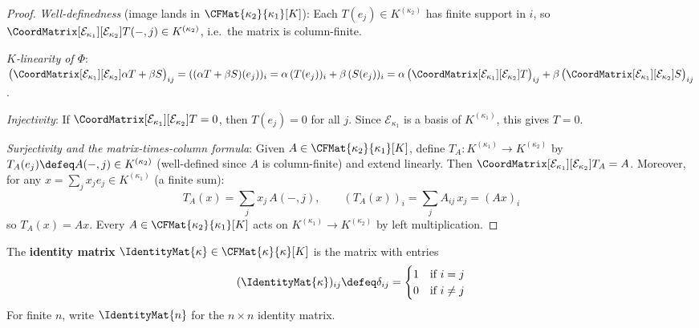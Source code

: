 \begin{proof}
    \textit{Well-definedness} (image lands in $\CFMat{\kappa_2}{\kappa_1}[K]$):
    Each $T(e_j) \in K^{(\kappa_2)}$ has finite support in $i$, so
    $\CoordMatrix[\mathcal{E}_{\kappa_1}][\mathcal{E}_{\kappa_2}]{T}(-,j)
    \in K^{(\kappa_2)}$, i.e.\ the matrix is column-finite.

    \textit{$K$-linearity of $\Phi$}:
    $\bigl(\CoordMatrix[\mathcal{E}_{\kappa_1}][\mathcal{E}_{\kappa_2}]{\alpha T + \beta S}
    \bigr)_{ij}
    = ((\alpha T + \beta S)(e_j))_i
    = \alpha\, (T(e_j))_i + \beta\, (S(e_j))_i
    = \alpha\, \bigl(\CoordMatrix[\mathcal{E}_{\kappa_1}][\mathcal{E}_{\kappa_2}]{T}
    \bigr)_{ij}
    + \beta\, \bigl(\CoordMatrix[\mathcal{E}_{\kappa_1}][\mathcal{E}_{\kappa_2}]{S}
    \bigr)_{ij}$.

    \textit{Injectivity}:
    If $\CoordMatrix[\mathcal{E}_{\kappa_1}][\mathcal{E}_{\kappa_2}]{T} = 0$, then
    $T(e_j) = 0$ for all $j$. Since $\mathcal{E}_{\kappa_1}$ is a basis of $K^{(\kappa_1)}$,
    this gives $T = 0$.

    \textit{Surjectivity and the matrix-times-column formula}:
    Given $A \in \CFMat{\kappa_2}{\kappa_1}[K]$, define $T_A: K^{(\kappa_1)} \to K^{(\kappa_2)}$
    by $T_A(e_j) \defeq A(-,j) \in K^{(\kappa_2)}$ (well-defined since $A$ is column-finite)
    and extend linearly. Then
    $\CoordMatrix[\mathcal{E}_{\kappa_1}][\mathcal{E}_{\kappa_2}]{T_A} = A$.
    Moreover, for any $x = \sum_j x_j e_j \in K^{(\kappa_1)}$ (a finite sum):
    \[
        T_A(x) = \sum_j x_j\, A(-,j), \qquad
        (T_A(x))_i = \sum_j A_{ij}\, x_j = (Ax)_i
    \]
    so $T_A(x) = Ax$. Every $A \in \CFMat{\kappa_2}{\kappa_1}[K]$ acts on
    $K^{(\kappa_1)} \to K^{(\kappa_2)}$ by left multiplication.
\end{proof}

\begin{definition}
\label{def:identity-matrix}
    The \textbf{identity matrix} $\IdentityMat{\kappa} \in \CFMat{\kappa}{\kappa}[K]$ is
    the matrix with entries
    \[
        (\IdentityMat{\kappa})_{ij} \defeq \delta_{ij}
        = \begin{cases} 1 & \text{if } i = j \\ 0 & \text{if } i \neq j \end{cases}
    \]
    For finite $n$, write $\IdentityMat{n}$ for the $n \times n$ identity matrix.
\end{definition}


